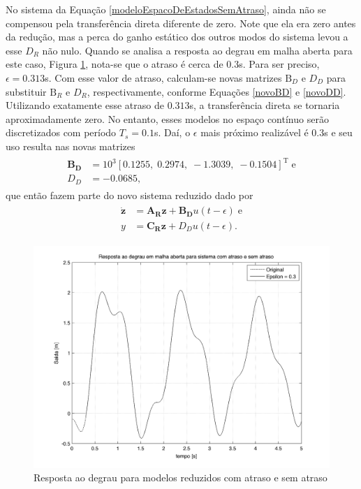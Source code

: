No sistema da Equação \ref{modeloEspacoDeEstadosSemAtraso}, ainda não se compensou pela transferência direta diferente de zero. Note que ela era zero antes da redução, mas a perca do ganho estático dos outros modos do sistema levou a esse $D_R$ não nulo. Quando se analisa a resposta ao degrau em malha aberta para este caso, Figura \ref{modeloMalhaAberta}, nota-se que o atraso é cerca de 0.3s. Para ser preciso, $\epsilon = 0.313$s. Com esse valor de atraso, calculam-se novas matrizes $\mathrm{B}_D$ e $D_D$ para substituir $\mathrm{B}_R$ e $D_R$, respectivamente, conforme Equações \ref{novoBD} e \ref{novoDD}. Utilizando exatamente esse atraso de $0.313$s, a transferência direta se tornaria aproximadamente zero. No entanto, esses modelos no espaço contínuo serão discretizados com período $T_s = 0.1$s. Daí, o $\epsilon$ mais próximo realizável é 0.3s e seu uso resulta nas novas matrizes \begin{align}
\begin{array}{ll}
	\mathbf{B_D} &= 10^3\left[0.1255,\;
    0.2974,\;
   -1.3039,\;
   -0.1504\right]^{\mathrm{T}}\;\mathrm{e}\\
	D_D &= -0.0685,
\end{array} \label{modeloReduzidoComEpsilon}
\end{align} que então fazem parte do novo sistema reduzido dado por\begin{align}
	\begin{array}{ll}
		\mathbf{\dot{z}} &= \mathbf{A_R}\mathbf{z} + \mathbf{B_D}u(t-\epsilon)\;\mathrm{e}\\
		y &= \mathbf{C_R}\mathbf{z} + D_D u(t-\epsilon).
	\end{array}\label{modeloEEComAtraso}
\end{align}

\begin{figure}[!ht]
\centering
\caption{Resposta ao degrau para modelos reduzidos com atraso e sem atraso\label{modeloMalhaAberta}}
\includegraphics[width=0.8\linewidth]{figs/resultados/modelo/respostaMalhaAberta}
\end{figure} 

